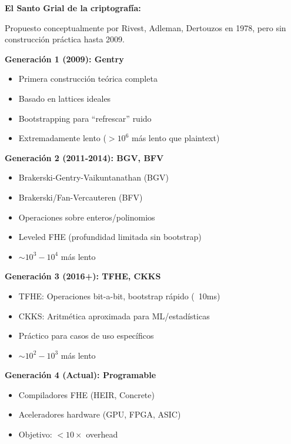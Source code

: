 \documentclass[11pt,a4paper,twoside]{book}
\theoremstyle{definition}
\theoremstyle{remark}
\begin{document}
\begin{mathnote}
\textbf{El Santo Grial de la criptografía:}

Propuesto conceptualmente por Rivest, Adleman, Dertouzos en 1978, pero sin construcción práctica hasta 2009.

\textbf{Generación 1 (2009): Gentry}
\begin{itemize}
    \item Primera construcción teórica completa
    \item Basado en lattices ideales
    \item Bootstrapping para ``refrescar'' ruido
    \item Extremadamente lento ($>10^6$ más lento que plaintext)
\end{itemize}

\textbf{Generación 2 (2011-2014): BGV, BFV}
\begin{itemize}
    \item Brakerski-Gentry-Vaikuntanathan (BGV)
    \item Brakerski/Fan-Vercauteren (BFV)
    \item Operaciones sobre enteros/polinomios
    \item Leveled FHE (profundidad limitada sin bootstrap)
    \item $\sim10^3-10^4$ más lento
\end{itemize}

\textbf{Generación 3 (2016+): TFHE, CKKS}
\begin{itemize}
    \item TFHE: Operaciones bit-a-bit, bootstrap rápido (~10ms)
    \item CKKS: Aritmética aproximada para ML/estadísticas
    \item Práctico para casos de uso específicos
    \item $\sim10^2-10^3$ más lento
\end{itemize}

\textbf{Generación 4 (Actual): Programable}
\begin{itemize}
    \item Compiladores FHE (HEIR, Concrete)
    \item Aceleradores hardware (GPU, FPGA, ASIC)
    \item Objetivo: $<10\times$ overhead
\end{itemize}
\end{mathnote}
\end{document}
